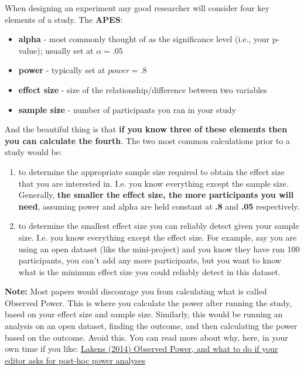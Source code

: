 \documentclass[]{book}
\providecommand{\tightlist}{%
  \setlength{\itemsep}{0pt}\setlength{\parskip}{0pt}}
\begin{document}
When designing an experiment any good researcher will consider four key elements of a study. The \textbf{APES}:

\begin{itemize}
\tightlist
\item
  \textbf{alpha} - most commonly thought of as the significance level (i.e., your p-value); usually set at \(\alpha = .05\)
\item
  \textbf{power} - typically set at \(power = .8\)
\item
  \textbf{effect size} - size of the relationship/difference between two variables
\item
  \textbf{sample size} - number of participants you ran in your study
\end{itemize}

And the beautiful thing is that \textbf{if you know three of these elements then you can calculate the fourth}. The two most common calculations prior to a study would be:

\begin{enumerate}
\def\labelenumi{\arabic{enumi}.}
\tightlist
\item
  to determine the appropriate sample size required to obtain the effect size that you are interested in. I.e. you know everything except the sample size. Generally, \textbf{the smaller the effect size, the more participants you will need}, assuming power and alpha are held constant at \textbf{.8} and \textbf{.05} respectively.
\item
  to determine the smallest effect size you can reliably detect given your sample size. I.e. you know everything except the effect size. For example, say you are using an open dataset (like the mini-project) and you know they have run 100 participants, you can't add any more participants, but you want to know what is the minimum effect size you could reliably detect in this dataset.
\end{enumerate}

\textbf{Note:} Most papers would discourage you from calculating what is called Observed Power. This is where you calculate the power after running the study, based on your effect size and sample size. Similarly, this would be running an analysis on an open dataset, finding the outcome, and then calculating the power based on the outcome. Avoid this. You can read more about why, here, in your own time if you like: \href{http://daniellakens.blogspot.com/2014/12/observed-power-and-what-to-do-if-your.html}{Lakens (2014) Observed Power, and what to do if your editor asks for post-hoc power analyses}
\end{document}
